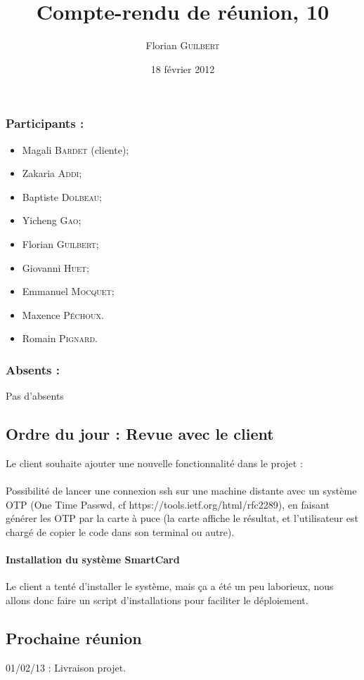 \documentclass[a4paper,10pt]{article}
\author{Florian \textsc{Guilbert}}
\title{Compte-rendu de réunion, 10}
\date{18 février 2012}
\begin{document}
\maketitle

\subsubsection*{Participants : }
\begin{itemize}
    \item Magali \textsc{Bardet} (cliente);
    \item Zakaria \textsc{Addi};
    \item Baptiste \textsc{Dolbeau};
    \item Yicheng \textsc{Gao};
    \item Florian \textsc{Guilbert};
    \item Giovanni \textsc{Huet};
    \item Emmanuel \textsc{Mocquet};
    \item Maxence  \textsc{Péchoux}.
    \item Romain \textsc{Pignard}.
\end{itemize}

\subsubsection*{Absents : }
Pas d'absents

\subsection*{Ordre du jour : Revue avec le client}

Le client souhaite ajouter une nouvelle fonctionnalité dans le projet : 
\paragraph{}
Possibilité de lancer une connexion ssh sur une machine distante avec un
système OTP (One Time Passwd, cf https://tools.ietf.org/html/rfc2289),
en faisant générer les OTP par la carte à puce (la carte affiche le
résultat, et l'utilisateur est chargé de copier le code dans son
terminal ou autre).

\paragraph{Installation du système SmartCard} Le client a tenté d'installer
le système, mais ça a été un peu laborieux, nous allons donc faire un
script d'installations pour faciliter le déploiement.

\subsection*{Prochaine réunion}
01/02/13 : Livraison projet.
\end{document}
